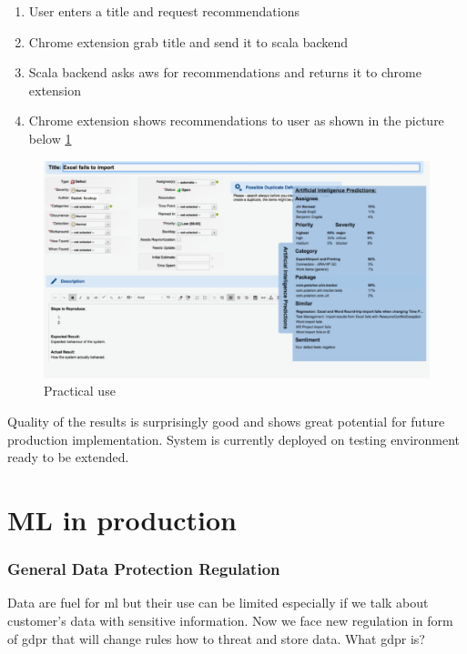 \documentclass[thesis=M,english]{FITthesis}[2012/06/26]
\begin{document}
\begin{enumerate}[nosep]
	\item User enters a title and request recommendations
	\item Chrome extension grab title and send it to scala backend
	\item Scala backend asks \acrshort{aws} for recommendations and returns it to chrome extension
	\item Chrome extension shows recommendations to user as shown in the picture below \ref{fig:defect_bot_workitem}\\
\end{enumerate}

\begin{figure}[h!]\centering
	\includegraphics[width=1\textwidth]{pictures/defect_bot_workitem}
	\caption{Practical use}\label{fig:defect_bot_workitem}
\end{figure}

Quality of the results is surprisingly good and shows great potential for future production implementation. System is currently deployed on testing environment ready to be extended.

\chapter{ML in production}



\subsection{General Data Protection Regulation}

Data are fuel for \acrshort{ml} but their use can be limited especially if we talk about customer's data with sensitive information. Now we face new regulation in form of \acrshort{gdpr} that will change rules how to threat and store data. What \acrshort{gdpr} is?\\
\end{document}
